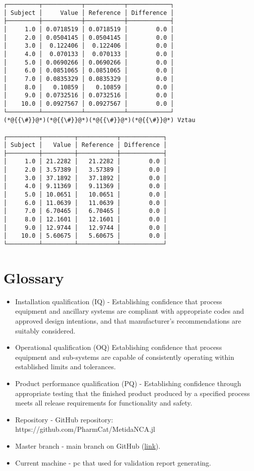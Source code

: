 \documentclass[12pt,a4paper]{article}
\begin{document}
\begin{lstlisting}
┌─────────┬───────────┬───────────┬────────────┐
│ Subject │     Value │ Reference │ Difference │
├─────────┼───────────┼───────────┼────────────┤
│     1.0 │ 0.0718519 │ 0.0718519 │        0.0 │
│     2.0 │ 0.0504145 │ 0.0504145 │        0.0 │
│     3.0 │  0.122406 │  0.122406 │        0.0 │
│     4.0 │  0.070133 │  0.070133 │        0.0 │
│     5.0 │ 0.0690266 │ 0.0690266 │        0.0 │
│     6.0 │ 0.0851065 │ 0.0851065 │        0.0 │
│     7.0 │ 0.0835329 │ 0.0835329 │        0.0 │
│     8.0 │   0.10859 │   0.10859 │        0.0 │
│     9.0 │ 0.0732516 │ 0.0732516 │        0.0 │
│    10.0 │ 0.0927567 │ 0.0927567 │        0.0 │
└─────────┴───────────┴───────────┴────────────┘
(*@{{\#}}@*)(*@{{\#}}@*)(*@{{\#}}@*)(*@{{\#}}@*) Vztau

┌─────────┬─────────┬───────────┬────────────┐
│ Subject │   Value │ Reference │ Difference │
├─────────┼─────────┼───────────┼────────────┤
│     1.0 │ 21.2282 │   21.2282 │        0.0 │
│     2.0 │ 3.57389 │   3.57389 │        0.0 │
│     3.0 │ 37.1892 │   37.1892 │        0.0 │
│     4.0 │ 9.11369 │   9.11369 │        0.0 │
│     5.0 │ 10.0651 │   10.0651 │        0.0 │
│     6.0 │ 11.0639 │   11.0639 │        0.0 │
│     7.0 │ 6.70465 │   6.70465 │        0.0 │
│     8.0 │ 12.1601 │   12.1601 │        0.0 │
│     9.0 │ 12.9744 │   12.9744 │        0.0 │
│    10.0 │ 5.60675 │   5.60675 │        0.0 │
└─────────┴─────────┴───────────┴────────────┘
\end{lstlisting}


\section{Glossary}
\begin{itemize}
\item Installation qualification (IQ) - Establishing confidence that process equipment and ancillary systems are compliant with appropriate codes and approved design intentions, and that manufacturer's recommendations are suitably considered.


\item Operational qualification (OQ) Establishing confidence that process equipment and sub-systems are capable of consistently operating within established limits and tolerances.


\item Product performance qualification (PQ) - Establishing confidence through appropriate testing that the finished product produced by a specified process meets all release requirements for functionality and safety.


\item Repository - GitHub repository: https://github.com/PharmCat/MetidaNCA.jl


\item Master branch - main branch on GitHub (\href{https://github.com/PharmCat/MetidaNCA.jl/tree/main}{link}).


\item Current machine - pc that used for validation report generating.

\end{itemize}
\end{document}

